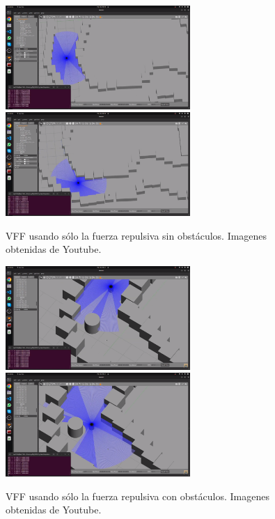 \begin{figure} [H]
    \begin{center}
        \includegraphics[width=7cm]{figs/c6/VFF_rs1.png}
        \includegraphics[width=7cm]{figs/c6/VFF_rs2.png}
    \end{center}
    \caption[Secuencia VFF fuerza repulsiva sin obstáculos]{VFF usando sólo la fuerza repulsiva sin obstáculos. Imagenes obtenidas de Youtube\footnotemark.}
    \label{fig:VFF_r_S}
\end{figure}
\begin{figure} [H]
    \begin{center}
        \includegraphics[width=7cm]{figs/c6/VFF_rc1.png}
        \includegraphics[width=7cm]{figs/c6/VFF_rc2.png}
    \end{center}
    \caption[Secuencia bloque MotorDriverROS2 real]{VFF usando sólo la fuerza repulsiva con obstáculos. Imagenes obtenidas de Youtube\footnotemark.}
    \label{fig:MotordriverReal}
\end{figure}

